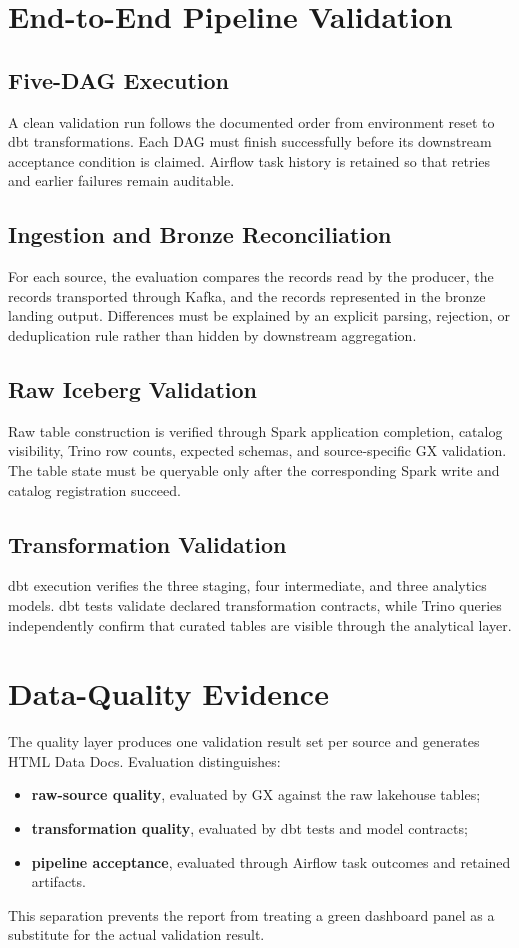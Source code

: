 \section{End-to-End Pipeline Validation}

\subsection{Five-DAG Execution}
A clean validation run follows the documented order from environment reset to dbt transformations. Each DAG must finish successfully before its downstream acceptance condition is claimed. Airflow task history is retained so that retries and earlier failures remain auditable.

\subsection{Ingestion and Bronze Reconciliation}
For each source, the evaluation compares the records read by the producer, the records transported through Kafka, and the records represented in the bronze landing output. Differences must be explained by an explicit parsing, rejection, or deduplication rule rather than hidden by downstream aggregation.

\subsection{Raw Iceberg Validation}
Raw table construction is verified through Spark application completion, catalog visibility, Trino row counts, expected schemas, and source-specific GX validation. The table state must be queryable only after the corresponding Spark write and catalog registration succeed.

\subsection{Transformation Validation}
dbt execution verifies the three staging, four intermediate, and three analytics models. dbt tests validate declared transformation contracts, while Trino queries independently confirm that curated tables are visible through the analytical layer.

\section{Data-Quality Evidence}
The quality layer produces one validation result set per source and generates HTML Data Docs. Evaluation distinguishes:
\begin{itemize}
    \item \textbf{raw-source quality}, evaluated by GX against the raw lakehouse tables;
    \item \textbf{transformation quality}, evaluated by dbt tests and model contracts;
    \item \textbf{pipeline acceptance}, evaluated through Airflow task outcomes and retained artifacts.
\end{itemize}
This separation prevents the report from treating a green dashboard panel as a substitute for the actual validation result.

